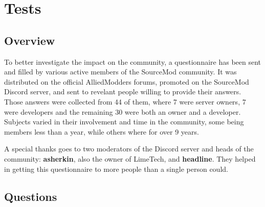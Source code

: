 \chapter{Tests}

\section{Overview}

To better investigate the impact on the community, a questionnaire has been sent and filled by various active members of the SourceMod community.
It was distributed on the official AlliedModders forums, promoted on the SourceMod Discord server, and sent to revelant people willing to provide their answers.
Those answers were collected from 44 of them, where 7 were server owners, 7 were developers and the remaining 30 were both an owner and a developer.
Subjects varied in their involvement and time in the community, some being members less than a year, while others where for over 9 years.

A special thanks goes to two moderators of the Discord server and heads of the community: \textbf{asherkin}, also the owner of LimeTech, and \textbf{headline}.
They helped in getting this questionnaire to more people than a single person could.

\section{Questions}

